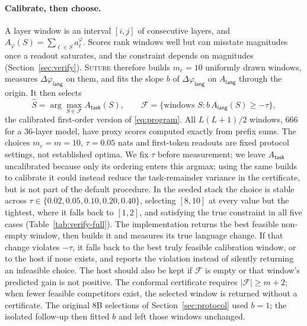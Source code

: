 \documentclass{article}
\theoremstyle{plain}
\theoremstyle{definition}
\theoremstyle{remark}
\newcommand{\util}{\mathsf{task}}
\newcommand{\risk}{\mathsf{lang}}
\begin{document}
\paragraph{Calibrate, then choose.}
A layer window is an interval $[i,j]$ of consecutive layers, and
$A_\varphi(S)=\sum_{\ell\in S}a^{\varphi}_\ell$. Scores rank windows well but can
misstate magnitudes once a readout saturates, and the constraint depends on
magnitudes (Section~\ref{sec:verify}). \textsc{Suture} therefore builds $m_c=10$
uniformly drawn windows, measures $\Delta\varphi_\risk$ on them, and fits the
slope $b$ of $\Delta\varphi_\risk$ on $A_\risk$ through the origin. It then
selects
\begin{equation}
\label{eq:select}
\widehat{S}=\arg\max_{S\in\mathcal{F}}A_\util(S),
\qquad
\mathcal{F}=\{\text{windows } S : b\,A_\risk(S)\ge-\tau\},
\end{equation}
the calibrated first-order version of \eqref{eq:program}. All $L(L+1)/2$ windows,
$666$ for a 36-layer model, have proxy scores computed exactly from prefix sums.
The choices $m_c=m=10$, $\tau=0.05$ nats and first-token readouts are fixed
protocol settings, not established optima. We fix $\tau$ before measurement;
we leave $A_\util$ uncalibrated because only its ordering enters this argmax;
using the same builds to calibrate it could instead reduce the task-remainder
variance in the certificate, but is not part of the default procedure.
In the seeded stack the choice is stable across
$\tau\in\{0.02,0.05,0.10,0.20,0.40\}$, selecting $[8,10]$ at every value but the
tightest, where it falls back to $[1,2]$, and satisfying the true constraint in
all five cases (Table~\ref{tab:verify-full}). The implementation returns the best
feasible non-empty window, then builds it and measures its true language change.
If that change violates $-\tau$, it falls back to the best truly feasible
calibration window, or to the host if none exists, and reports the violation
instead of silently returning an infeasible choice. The host should also be kept
if $\mathcal{F}$ is empty or that window's predicted gain is not positive. The
conformal certificate requires $|\mathcal{F}|\ge m+2$; when fewer feasible
competitors exist, the selected window is returned without a certificate. The
original 8B selections of Section~\ref{sec:protocol} used $b=1$; the isolated
follow-up then fitted $b$ and left those windows unchanged.
\end{document}
